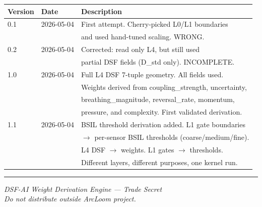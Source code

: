 \documentclass[11pt,a4paper]{article}
\begin{document}
\begin{center}
\begin{tabular}{@{}lll@{}}
\toprule
\textbf{Version} & \textbf{Date} & \textbf{Description} \\
\midrule
0.1 & 2026-05-04 & First attempt. Cherry-picked L0/L1 boundaries \\
    &            & and used hand-tuned scaling. WRONG. \\
0.2 & 2026-05-04 & Corrected: read only L4, but still used \\
    &            & partial DSF fields (D\_std only). INCOMPLETE. \\
1.0 & 2026-05-04 & Full L4 DSF 7-tuple geometry. All fields used. \\
    &            & Weights derived from coupling\_strength, uncertainty, \\
    &            & breathing\_magnitude, reversal\_rate, momentum, \\
    &            & pressure, and complexity. First validated derivation. \\
1.1 & 2026-05-04 & BSIL threshold derivation added. L1 gate boundaries \\
    &            & $\rightarrow$ per-sensor BSIL thresholds (coarse/medium/fine). \\
    &            & L4 DSF $\rightarrow$ weights. L1 gates $\rightarrow$ thresholds. \\
    &            & Different layers, different purposes, one kernel run. \\
\bottomrule
\end{tabular}
\end{center}

\vspace{2em}
\noindent\rule{\textwidth}{0.4pt}
\begin{center}
\small\textit{DSF-AI Weight Derivation Engine --- Trade Secret}\\
\small\textit{Do not distribute outside ArcLoom project.}
\end{center}
\end{document}
